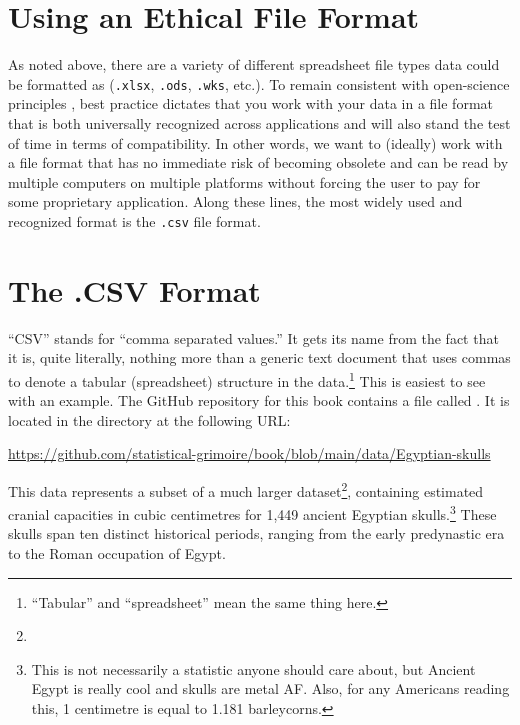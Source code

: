 \section{Using an Ethical File Format}
\label{sec:ethical_file}

As noted above, there are a variety of different spreadsheet file types data could be formatted as (\texttt{.xlsx}, \texttt{.ods}, \texttt{.wks}, etc.). To remain consistent with open-science principles \parencite{UNESCO_open_sci}, best practice dictates that you work with your data in a file format that is both universally recognized across applications and will also stand the test of time in terms of compatibility.  In other words, we want to (ideally) work with a file format that has no immediate risk of becoming obsolete and can be read by multiple computers on multiple platforms without forcing the user to pay for some proprietary application. Along these lines, the most widely used and recognized format is the \texttt{.csv} file format.

\section{The .CSV Format}

``CSV'' stands for ``comma separated values.'' It gets its name from the fact that it is, quite literally, nothing more than a generic text document that uses commas to denote a tabular (spreadsheet) structure in the data.\footnote{``Tabular'' and ``spreadsheet'' mean the same thing here.} This is easiest to see with an example. The GitHub repository for this book contains a file called . It is located in the  directory at the following URL:

\begin{center}
\url{https://github.com/statistical-grimoire/book/blob/main/data/Egyptian-skulls}
\end{center}

\noindent

This data represents a subset of a much larger dataset\footnote{}, containing estimated cranial capacities in cubic centimetres for 1,449 ancient Egyptian skulls.\footnote{This is not necessarily a statistic anyone should care about, but Ancient Egypt is really cool and skulls are metal AF. Also, for any Americans reading this, 1 centimetre is equal to 1.181 barleycorns.} These skulls span ten distinct historical periods, ranging from the early predynastic era to the Roman occupation of Egypt.

